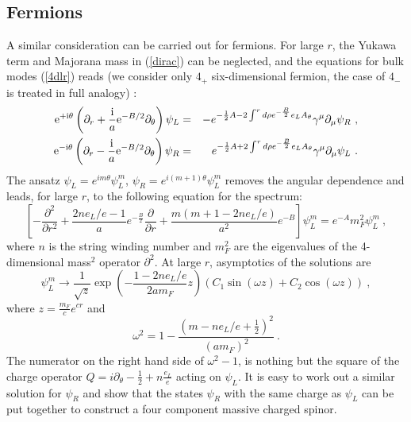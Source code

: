 \documentclass[a4paper,12pt]{article}
\begin{document}
\subsection{Fermions}
A similar consideration can be carried out for fermions. For large
$r$, the Yukawa term and Majorana mass in (\ref{dirac}) can be
neglected,  and the equations for bulk modes (\ref{4dlr}) reads (we
consider only $4_+$ six-dimensional fermion, the case of $4_-$ is
treated in full analogy) :
\begin{eqnarray}
{\rm e}^{+{\rm i}\theta} \left(\partial_r+{{\rm i}\over a}
{\rm e}^{-B/2}\partial_\theta\right)\psi_L &=&
- e^{-\frac{1}{2} A -2\int^r d\rho e^{-\frac{B}{2}}e_L A_\theta }
\gamma^\mu\partial_\mu\psi_R~,
\label{mes}
\\
\nonumber
{\rm e}^{-{\rm i}\theta} \left(\partial_r-{{\rm i}\over a}
{\rm e}^{-B/2}\partial_\theta\right)\psi_R &=& 
~~e^{-\frac{1}{2} A +2\int^r d\rho e^{-\frac{B}{2}}e_L
A_\theta}
\gamma^\mu\partial_\mu\psi_L~.
\end{eqnarray}
The ansatz $\psi_L=e^{im\theta}\psi_L^m$,
$\psi_R=e^{i(m+1)\theta}\psi_L^m$ removes the angular dependence and
leads, for large $r$, to the following equation for the spectrum:
\begin{equation}
\left[-\frac{\partial^2}{\partial r^2}
+\frac{2ne_L/e-1}{a}e^{-\frac{B}{2}}
\frac{\partial}{\partial r} +
\frac{m(m+1-2ne_L/e)}{a^2}e^{-B} \right] \psi_L ^m = e^{-A} m_F^2
\psi_L^m~,
\end{equation}
where $n$ is the string winding number and $m_F^2$ are the
eigenvalues of the 4-dimensional mass$^2$ operator $\partial^2$. At
large
$r$, asymptotics of the solutions are
\begin{equation}
\psi_L ^{m} \to \frac{1}{\sqrt{z}} \exp
\left(-\frac{1-2ne_L/e}{2am_F}z\right)  \left(C_1 \sin(\omega z) +
C_2 \cos(\omega z)\right)~,
\end{equation}
where $z=\frac{m_F}{c} e^{cr}$ and
\begin{equation}
\omega^2=1- \frac{(m-ne_L/e+\frac{1}{2})^2}{(am_F)^2} ~.
\label{root}
\end{equation}
The numerator on the right hand side of $\omega^2-1$, is nothing but
the square of the charge operator $Q= i\partial_\theta - \frac{1}{2}+
n\frac{e_L}{e}$ acting on $\psi_L$. It is easy to work out a similar
solution for $\psi_R$ and show that  the states $\psi_R$ with the
same charge as $\psi_L$  can be put  together to construct a
four component massive charged spinor.
\end{document}
